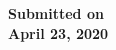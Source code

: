 \begin{titlepage}
\textbf{\large Submitted on}\\[0.5cm]
\textbf{\Large April 23, 2020} %


\vfill %

\end{titlepage}